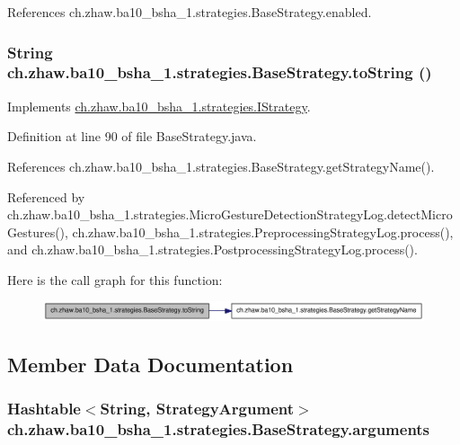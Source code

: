 References ch.zhaw.ba10\_\-bsha\_\-1.strategies.BaseStrategy.enabled.\hypertarget{classch_1_1zhaw_1_1ba10__bsha__1_1_1strategies_1_1BaseStrategy_adfb24fbd69261e8567269c5d59365e46}{
\subsubsection[{toString}]{\setlength{\rightskip}{0pt plus 5cm}String ch.zhaw.ba10\_\-bsha\_\-1.strategies.BaseStrategy.toString ()}}
\label{classch_1_1zhaw_1_1ba10__bsha__1_1_1strategies_1_1BaseStrategy_adfb24fbd69261e8567269c5d59365e46}


Implements \hyperlink{interfacech_1_1zhaw_1_1ba10__bsha__1_1_1strategies_1_1IStrategy_a2b109250e12270545e1c342c9d136bcd}{ch.zhaw.ba10\_\-bsha\_\-1.strategies.IStrategy}.

Definition at line 90 of file BaseStrategy.java.

References ch.zhaw.ba10\_\-bsha\_\-1.strategies.BaseStrategy.getStrategyName().

Referenced by ch.zhaw.ba10\_\-bsha\_\-1.strategies.MicroGestureDetectionStrategyLog.detectMicroGestures(), ch.zhaw.ba10\_\-bsha\_\-1.strategies.PreprocessingStrategyLog.process(), and ch.zhaw.ba10\_\-bsha\_\-1.strategies.PostprocessingStrategyLog.process().

Here is the call graph for this function:\nopagebreak
\begin{figure}[H]
\begin{center}
\leavevmode
\includegraphics[width=319pt]{classch_1_1zhaw_1_1ba10__bsha__1_1_1strategies_1_1BaseStrategy_adfb24fbd69261e8567269c5d59365e46_cgraph}
\end{center}
\end{figure}


\subsection{Member Data Documentation}
\hypertarget{classch_1_1zhaw_1_1ba10__bsha__1_1_1strategies_1_1BaseStrategy_ac15d972a209d299069ce7d7940e9322e}{
\subsubsection[{arguments}]{\setlength{\rightskip}{0pt plus 5cm}Hashtable$<$String, {\bf StrategyArgument}$>$ {\bf ch.zhaw.ba10\_\-bsha\_\-1.strategies.BaseStrategy.arguments}}}
\label{classch_1_1zhaw_1_1ba10__bsha__1_1_1strategies_1_1BaseStrategy_ac15d972a209d299069ce7d7940e9322e}


